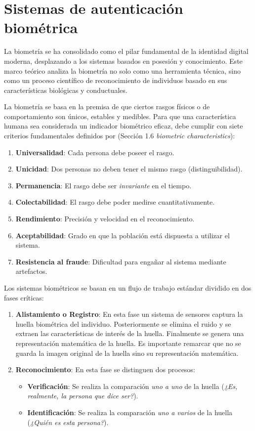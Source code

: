 \section{Sistemas de autenticación biométrica}

La biometría se ha consolidado como el pilar fundamental de la identidad digital moderna, 
desplazando a los sistemas basados en posesión y conocimiento. 
Este marco teórico analiza la biometría no solo como una herramienta técnica, sino como un proceso científico de reconocimiento 
de individuos basado en sus características biológicas y conductuales.

La biometría se basa en la premisa de que ciertos rasgos físicos o de comportamiento son únicos, estables y medibles.
Para que una característica humana sea considerada un indicador biométrico eficaz, debe cumplir con siete criterios fundamentales 
definidos por \cite{jain2008handbookofbiometrics} (Sección 1.6 \textit{biometric characteristics}):

\begin{enumerate}
    \item \textbf{Universalidad}: Cada persona debe poseer el rasgo.
    \item \textbf{Unicidad}: Dos personas no deben tener el mismo rasgo (distinguibilidad).
    \item \textbf{Permanencia}: El rasgo debe ser \textit{invariante} en el tiempo.
    \item \textbf{Colectabilidad}: El rasgo debe poder medirse cuantitativamente.
    \item \textbf{Rendimiento}: Precisión y velocidad en el reconocimiento.
    \item \textbf{Aceptabilidad}: Grado en que la población está dispuesta a utilizar el sistema.
    \item \textbf{Resistencia al fraude}: Dificultad para engañar al sistema mediante artefactos.
\end{enumerate}

Los sistemas biométricos se basan en un flujo de trabajo estándar dividido en dos fases críticas:

\begin{enumerate}
    \item \textbf{Alistamiento o Registro}: En esta fase un sistema de sensores captura la huella biométrica del individuo. Posteriormente se elimina el ruido y se extraen las características de interés de la huella. Finalmente se genera una representación matemática de la huella. Es importante remarcar que no se guarda la imagen original de la huella sino su representación matemática.
    \item \textbf{Reconocimiento}: En esta fase se distinguen dos procesos:
    \begin{itemize}
        \item \textbf{Verificación}: Se realiza la comparación \textit{uno a uno} de la huella (\textit{¿Es, realmente, la persona que dice ser?}).
        \item \textbf{Identificación}: Se realiza la comparación \textit{uno a varios} de la huella (\textit{¿Quién es esta persona?}).
    \end{itemize}
\end{enumerate}

